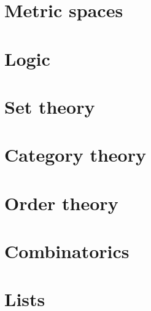 \documentclass[bibliography=totocnumbered]{scrartcl}
\begin{document}
\section{Metric spaces}\label{sec:metric_spaces}





\section{Logic}\label{sec:logic}





\section{Set theory}\label{sec:set_theory}





\section{Category theory}\label{sec:category_theory}





\section{Order theory}\label{sec:order_theory}




\section{Combinatorics}\label{sec:combinatorics}


\section{Lists}

\listofaoc\label{list:aoc}
\listoflem\label{list:lem}
\listofusc\label{list:usc}

\printbibliography
\end{document}
